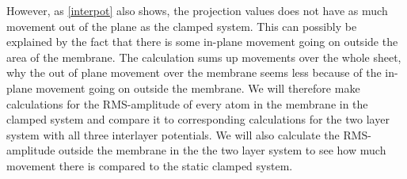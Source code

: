However, as \cref{interpot} also shows, the projection values does not have as much movement out of the plane as the clamped system. This can possibly be explained by the fact that there is some in-plane movement going on outside the area of the membrane. The calculation sums up movements over the whole sheet, why the out of plane movement over the membrane seems less because of the in-plane movement going on outside the membrane. We will therefore make calculations for the RMS-amplitude of every atom in the membrane in the clamped system and compare it to corresponding calculations for the two layer system with all three interlayer potentials. We will also calculate the RMS-amplitude outside the membrane in the the two layer system to see how much movement there is compared to the static clamped system. 